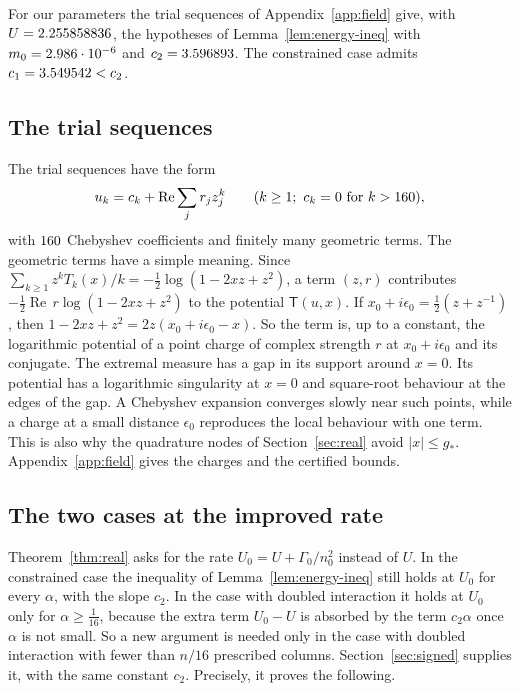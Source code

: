 For our parameters the trial sequences of Appendix~\ref{app:field} give, with $U=2.255858836$, the hypotheses of
Lemma~\ref{lem:energy-ineq} with $m_0=2.986\cdot10^{-6}$ and $c_2=3.596893$. The constrained case admits $c_1=3.549542<c_2$.

\subsection{The trial sequences}\label{ssec:trials}
The trial sequences have the form
\begin{equation}\label{eq:trial}
 u_k=c_k+\operatorname{Re}\sum_jr_jz_j^k\qquad(k\ge1;\ c_k=0\text{ for }k>160),
\end{equation}
with $160$ Chebyshev coefficients and finitely many geometric terms. The geometric terms have a simple
meaning. Since $\sum_{k\ge1}z^kT_k(x)/k=-\frac12\log(1-2xz+z^2)$, a term $(z,r)$ contributes
$-\frac12\operatorname{Re}\,r\log(1-2xz+z^2)$ to the potential $\mathsf T(u,x)$. If
$x_0+i\epsilon_0=\frac12(z+z^{-1})$, then $1-2xz+z^2=2z(x_0+i\epsilon_0-x)$. So the term is, up to a constant,
the logarithmic potential of a point charge of complex strength $r$ at $x_0+i\epsilon_0$ and its conjugate. The
extremal measure has a gap in its support around $x=0$. Its potential has a logarithmic singularity at $x=0$
and square-root behaviour at the edges of the gap. A Chebyshev expansion converges slowly near such points,
while a charge at a small distance $\epsilon_0$ reproduces the local behaviour with one term. This is also why
the quadrature nodes of Section~\ref{sec:real} avoid $|x|\le g_*$. Appendix~\ref{app:field} gives the charges
and the certified bounds.

\subsection{The two cases at the improved rate}\label{ssec:cases}
Theorem~\ref{thm:real} asks for the rate $U_0=U+\Gamma_0/n_0^2$ instead of $U$. In the constrained case the
inequality of Lemma~\ref{lem:energy-ineq} still holds at $U_0$ for every $\alpha$, with the slope $c_2$. In the
case with doubled interaction it holds at $U_0$ only for $\alpha\ge\frac1{16}$, because the extra term $U_0-U$
is absorbed by the term $c_2\alpha$ once $\alpha$ is not small. So a new argument is needed only in the case
with doubled interaction with fewer than $n/16$ prescribed columns. Section~\ref{sec:signed} supplies it,
with the same constant $c_2$. Precisely, it proves the following.

